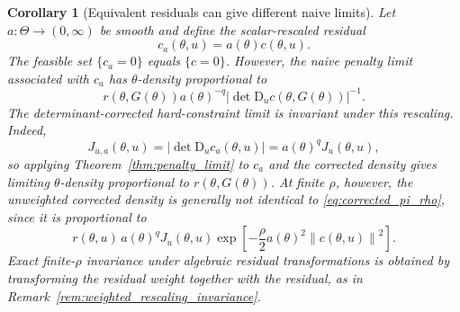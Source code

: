 \documentclass[11pt]{article}
\newtheorem{corollary}{Corollary}
\newcommand{\D}{\mathrm{D}}
\newcommand{\abs}[1]{\left\lvert #1\right\rvert}
\newcommand{\norm}[1]{\left\lVert #1\right\rVert}
\begin{document}
\begin{corollary}[Equivalent residuals can give different naive limits]
\label{cor:scaling}
Let \(a:\Theta\to(0,\infty)\) be smooth and define the scalar-rescaled residual
\begin{equation}
 c_a(\theta,u)=a(\theta)c(\theta,u).
\end{equation}
The feasible set \(\{c_a=0\}\) equals \(\{c=0\}\). However, the naive penalty limit associated with \(c_a\) has \(\theta\)-density proportional to
\begin{equation}
 r(\theta,G(\theta))
 a(\theta)^{-q}
 \abs{\det\D_u c(\theta,G(\theta))}^{-1}.
\end{equation}
The determinant-corrected hard-constraint limit is invariant under this rescaling. Indeed,
\[J_{u,a}(\theta,u) = \abs{\det \D_u c_a(\theta,u)} =a(\theta)^q J_u(\theta,u),\]
so applying Theorem~\ref{thm:penalty_limit} to \(c_a\) and the corrected density gives limiting \(\theta\)-density proportional to \(r(\theta,G(\theta))\). At finite \(\rho\), however, the unweighted corrected density is generally not identical to \eqref{eq:corrected_pi_rho}, since it is proportional to
\[ r(\theta,u)\, a(\theta)^qJ_u(\theta,u) \exp\!\left[-\frac{\rho}{2}a(\theta)^2\norm{c(\theta,u)}^2\right].\]
Exact finite-\(\rho\) invariance under algebraic residual transformations is obtained by transforming the residual weight together with the residual, as in Remark~\ref{rem:weighted_rescaling_invariance}.
\end{corollary}
\end{document}
